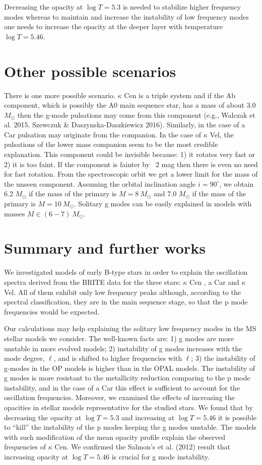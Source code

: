 \documentclass{ptapap}
\begin{document}
Decreasing the opacity at $\log T =5.3$ is needed to stabilize higher frequency modes
whereas to maintain and increase the instability of low frequency modes one needs to increase
the opacity at the deeper layer with temperature $\log T=5.46$.


\section{Other possible scenarios}
There is one more possible scenario.
$\kappa$ Cen is a triple system and if the Ab component, which is possibly the A0 main sequence star, has a mass of about 3.0 $M_\odot$
then the g-mode pulsations may come from this component (e.g., Walczak et al. 2015, Szewczuk \& Daszynska-Daszkiewicz 2016).
Similarly, in the case of a Car pulsation may originate from the companion.
In the case of $\kappa$ Vel, the pulsations of the lower mass companion seem to be the most credible explanation.
This component could be invisible because: 1) it rotates very fast or 2) it is too faint.
If the component is fainter by ~2 mag then there is even no need for fast rotation.
From the spectroscopic orbit we get a lower limit for the mass of the unseen component.
Assuming the orbital inclination angle $i=90^\circ$, we obtain 6.2 $M_\odot$ if the mass of the primary is $M=8~M_\odot$
and 7.0 $M_\odot$ if the mass of the primary is $M=10~M_\odot$. Solitary g modes can be easily
explained in models with masses $M\in (6 - 7) ~M_\odot$.


\section{Summary and further works}

We investigated models of early B-type stars in order to explain the oscillation spectra derived from the BRITE data
for the three stars: $\kappa$ Cen , a Car and $\kappa$ Vel. All of them exhibit only low frequency peaks although,
according to the spectral classification, they are in the main sequence stage, so that the p mode frequencies would be expected.

Our calculations may help explaining the solitary low frequency modes in the MS stellar models we consider.
The well-known facts are: 1) g modes are more unstable in more evolved models; 2) instability of g modes increases with the mode degree, $\ell$,
and is shifted to higher frequencies with $\ell$; 3) the instability of g-modes in the OP models is higher than in the OPAL models.
The instability of g modes is more resistant to the metallicity reduction comparing to the p mode instability,
and in the case of a Car this effect is sufficient to account for the oscillation frequencies.
Moreover, we examined the effects of increasing the opacities in stellar models representative for the studied stars.
We found that by decreasing the opacity at $\log T=5.3$ and increasing at $\log T=5.46$
it is possible to ``kill'' the instability of the p modes keeping the g modes unstable.
The models with such modification of the mean opacity profile explain the observed frequencies of $\kappa$ Cen.
We confirmed the Salmon's et al. (2012) result that increasing opacity at $\log T=5.46$ is crucial for g mode instability.
\end{document}
